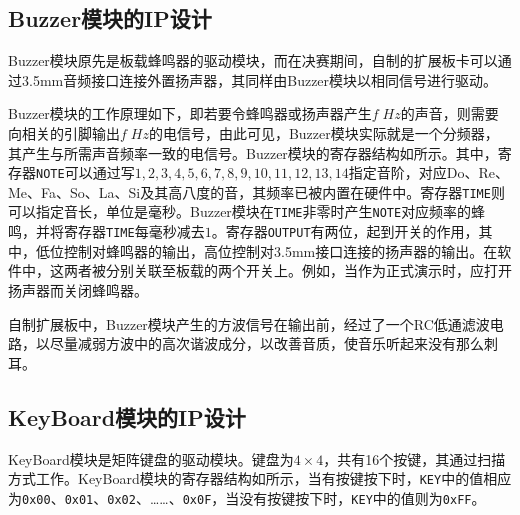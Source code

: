 



\subsection{Buzzer模块的IP设计}
Buzzer模块原先是板载蜂鸣器的驱动模块，而在决赛期间，自制的扩展板卡可以通过3.5mm音频接口连接外置扬声器，其同样由Buzzer模块以相同信号进行驱动。

Buzzer模块的工作原理如下，即若要令蜂鸣器或扬声器产生$f\;\si{Hz}$的声音，则需要向相关的引脚输出$f\;\si{Hz}$的电信号，由此可见，Buzzer模块实际就是一个分频器，其产生与所需声音频率一致的电信号。Buzzer模块的寄存器结构如所示。其中，寄存器\texttt{NOTE}可以通过写$1,2,3,4,5,6,7,8,9,10,11,12,13,14$指定音阶，对应Do、Re、Me、Fa、So、La、Si及其高八度的音，其频率已被内置在硬件中。寄存器\texttt{TIME}则可以指定音长，单位是毫秒。Buzzer模块在\texttt{TIME}非零时产生\texttt{NOTE}对应频率的蜂鸣，并将寄存器\texttt{TIME}每毫秒减去$1$。寄存器\texttt{OUTPUT}有两位，起到开关的作用，其中，低位控制对蜂鸣器的输出，高位控制对3.5mm接口连接的扬声器的输出。在软件中，这两者被分别关联至板载的两个开关上。例如，当作为正式演示时，应打开扬声器而关闭蜂鸣器。


自制扩展板中，Buzzer模块产生的方波信号在输出前，经过了一个RC低通滤波电路，以尽量减弱方波中的高次谐波成分，以改善音质，使音乐听起来没有那么刺耳。

\subsection{KeyBoard模块的IP设计}
KeyBoard模块是矩阵键盘的驱动模块。键盘为$4\times 4$，共有16个按键，其通过扫描方式工作。KeyBoard模块的寄存器结构如所示，当有按键按下时，\texttt{KEY}中的值相应为\texttt{0x00}、\texttt{0x01}、\texttt{0x02}、……、\texttt{0x0F}，当没有按键按下时，\texttt{KEY}中的值则为\texttt{0xFF}。



